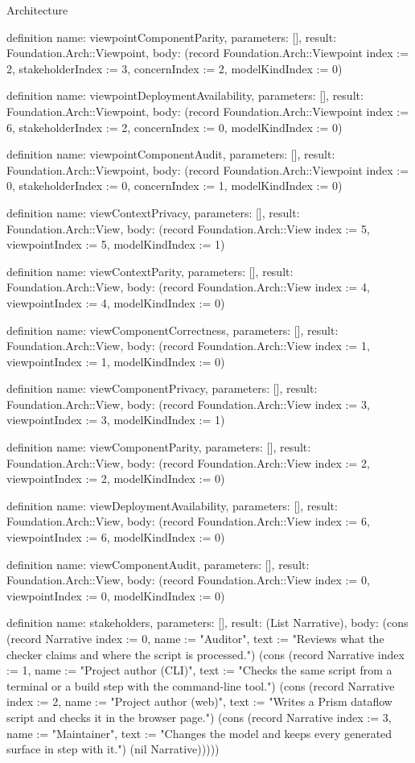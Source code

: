 \begin{lexlean}{Architecture}
\begin{semanticmodule}
definition{
  name: viewpointComponentParity,
  parameters: [],
  result: Foundation.Arch::Viewpoint,
  body: (record Foundation.Arch::Viewpoint {index := 2, stakeholderIndex := 3, concernIndex := 2, modelKindIndex := 0})
}

definition{
  name: viewpointDeploymentAvailability,
  parameters: [],
  result: Foundation.Arch::Viewpoint,
  body: (record Foundation.Arch::Viewpoint {index := 6, stakeholderIndex := 2, concernIndex := 0, modelKindIndex := 0})
}

definition{
  name: viewpointComponentAudit,
  parameters: [],
  result: Foundation.Arch::Viewpoint,
  body: (record Foundation.Arch::Viewpoint {index := 0, stakeholderIndex := 0, concernIndex := 1, modelKindIndex := 0})
}

definition{
  name: viewContextPrivacy,
  parameters: [],
  result: Foundation.Arch::View,
  body: (record Foundation.Arch::View {index := 5, viewpointIndex := 5, modelKindIndex := 1})
}

definition{
  name: viewContextParity,
  parameters: [],
  result: Foundation.Arch::View,
  body: (record Foundation.Arch::View {index := 4, viewpointIndex := 4, modelKindIndex := 0})
}

definition{
  name: viewComponentCorrectness,
  parameters: [],
  result: Foundation.Arch::View,
  body: (record Foundation.Arch::View {index := 1, viewpointIndex := 1, modelKindIndex := 0})
}

definition{
  name: viewComponentPrivacy,
  parameters: [],
  result: Foundation.Arch::View,
  body: (record Foundation.Arch::View {index := 3, viewpointIndex := 3, modelKindIndex := 1})
}

definition{
  name: viewComponentParity,
  parameters: [],
  result: Foundation.Arch::View,
  body: (record Foundation.Arch::View {index := 2, viewpointIndex := 2, modelKindIndex := 0})
}

definition{
  name: viewDeploymentAvailability,
  parameters: [],
  result: Foundation.Arch::View,
  body: (record Foundation.Arch::View {index := 6, viewpointIndex := 6, modelKindIndex := 0})
}

definition{
  name: viewComponentAudit,
  parameters: [],
  result: Foundation.Arch::View,
  body: (record Foundation.Arch::View {index := 0, viewpointIndex := 0, modelKindIndex := 0})
}

definition{
  name: stakeholders,
  parameters: [],
  result: (List Narrative),
  body: (cons (record Narrative {index := 0, name := "Auditor", text := "Reviews what the checker claims and where the script is processed."}) (cons (record Narrative {index := 1, name := "Project author (CLI)", text := "Checks the same script from a terminal or a build step with the command-line tool."}) (cons (record Narrative {index := 2, name := "Project author (web)", text := "Writes a Prism dataflow script and checks it in the browser page."}) (cons (record Narrative {index := 3, name := "Maintainer", text := "Changes the model and keeps every generated surface in step with it."}) (nil Narrative)))))
}


\end{semanticmodule}
\end{lexlean}
